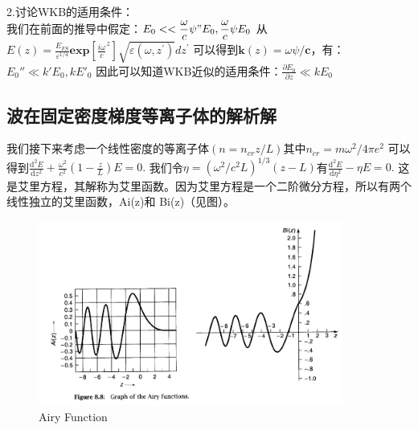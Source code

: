 \documentclass[12pt, a4paper, oneside]{ctexart}
\begin{document}
\begin{spacing}{2.0}
2.讨论WKB的适用条件：
\\
我们在前面的推导中假定：$\displaystyle E_{0}<<\frac{\omega}{c}\psi"E_{0},\frac{\omega}{c}\psi E_{0}$
从$\displaystyle E(z)=\frac{E_{F S}}{\varepsilon^{1/4}}\mathbf{exp}[\frac{i\omega}{c}^{z}]\sqrt{\varepsilon(\omega,z^{\prime})}d z^{\prime}$
可以得到$\mathbf{k}(z)=\omega\psi/\mathbf{c}$，有：$E_0''\ll k'E_0,kE'_0$
因此可以知道WKB近似的适用条件：$\displaystyle \frac{\partial E_0}{\partial z}\ll kE_0$


\subsection{波在固定密度梯度等离子体的解析解}
我们接下来考虑一个线性密度的等离子体$(n = n_{cr}z/L)$其中$n_{cr} = m\omega^2/4\pi e^2$\cite{lasertextbook1122}
可以得到$\displaystyle \frac{\mathrm{d}^2E}{\mathrm{d}z^2}+\frac{\omega^2}{c^2}\left(1-\frac{z}{L}\right)E=0.$
我们令$\eta = (\omega^2/c^2L)^{1/3}(z-L)$有$\displaystyle \frac{\mathrm{d}^2E}{\mathrm{d}\eta^2}-\eta E=0.$
这是艾里方程，其解称为艾里函数。因为艾里方程是一个二阶微分方程，所以有两个线性独立的艾里函数，Ai(z)和 Bi(z)（见图）。
\begin{figure}
    \centering
	\includegraphics[width=10cm]{airyfunction.jpg}
	\caption{Airy Function}
\end{figure}


\end{spacing}
\end{document}
